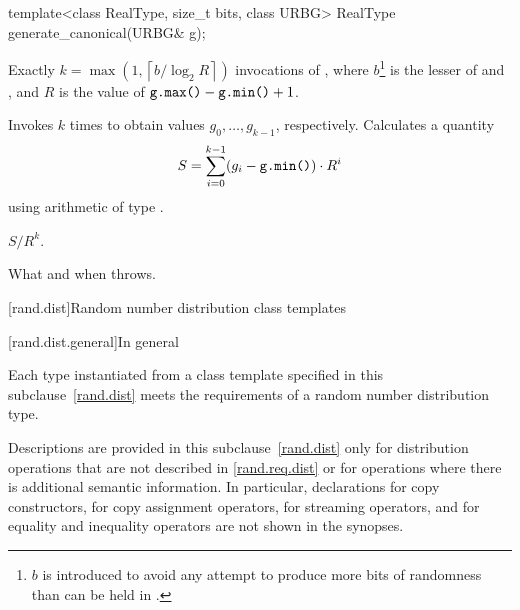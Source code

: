 %
\begin{itemdecl}
template<class RealType, size_t bits, class URBG>
 RealType generate_canonical(URBG& g);
\end{itemdecl}

\begin{itemdescr}
\pnum\complexity Exactly
 $k = \max(1, \left\lceil b / \log_2 R \right\rceil)$
 invocations
 of ,
 where $b$\footnote{$b$ is introduced
   to avoid any attempt
   to produce more bits of randomness
   than can be held in .}
   is the lesser of 
                and ,
 and
   $R$ is the value of $\texttt{g.max()} - \texttt{g.min()} + 1$.

\pnum\effects
 Invokes  $k$ times
 to obtain values $g_0, \dotsc, g_{k-1}$, respectively.
 Calculates a quantity
 \[
   S = \sum_{i=0}^{k-1} (g_i - \texttt{g.min()})
                        \cdot R^i
 \]
 using arithmetic of type
 .

\pnum
\returns $S / R^k$.

\pnum\throws What and when  throws.
\end{itemdescr}%




[rand.dist]{Random number distribution class templates}%

[rand.dist.general]{In general}

\pnum
Each type instantiated
from a class template specified in this subclause~\ref{rand.dist}
meets the requirements
of a random number distribution type.

\pnum
Descriptions are provided in this subclause~\ref{rand.dist}
only for distribution operations
that are not described in \ref{rand.req.dist}
or for operations where there is additional semantic information.
In particular,
declarations for copy constructors,
for copy assignment operators,
for streaming operators,
and for equality and inequality operators
are not shown in the synopses.

